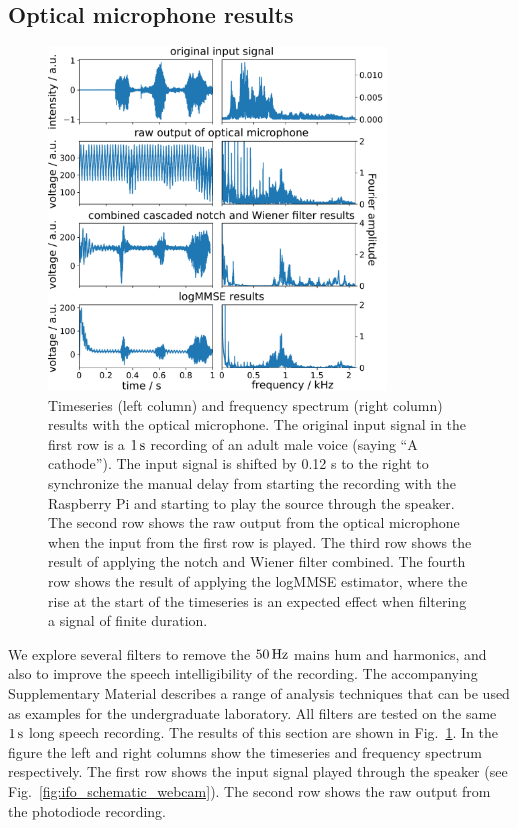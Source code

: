 \documentclass[paper-main.tex]{subfiles}
\begin{document}
\subsection{Optical microphone results}
\label{sec:opticalMicResults}

\begin{figure}
\begin{center}
\includegraphics[width=0.8\textwidth]{figures/combined_highlight_results_melatos_labelled.pdf}
\caption{\label{fig:notchWienerLogMMSEResults}
Timeseries (left column) and frequency spectrum (right column) results with the optical microphone. 
The original input signal in the first row is a $1\,{\rm s}$ recording of an adult male voice (saying ``A cathode''). 
 The input signal is shifted by 0.12 s to the right to synchronize the manual delay from starting the recording with the Raspberry Pi and starting to play the source through the speaker. 
The second row shows the raw output from the optical microphone when the input from the first row is played. 
The third row shows the result of applying the notch and Wiener filter combined. 
The fourth row shows the result of applying the logMMSE estimator, where the rise at the start of the timeseries is an expected effect when filtering a signal of finite duration. 
}
\end{center}
\end{figure}

We explore several filters to remove the $50\,{\rm Hz}$ mains hum and harmonics, and also to improve the speech intelligibility of the recording.
The accompanying Supplementary Material describes a range of analysis techniques that can be used as examples for the undergraduate laboratory. 
All filters are tested on the same $1\,{\rm s}$ long speech recording.
The results of this section are shown in Fig.~\ref{fig:notchWienerLogMMSEResults}. 
In the figure the left and right columns show the timeseries and frequency spectrum respectively. 
The first row shows the input signal played through the speaker (see Fig.~\ref{fig:ifo_schematic_webcam}). 
The second row shows the raw output from the photodiode recording. 
\end{document}
